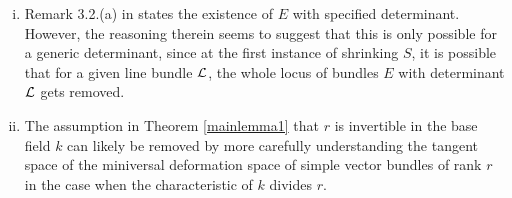 \documentclass[letterpaper,12pt]{amsart}
\theoremstyle{remark}
\begin{document}
\begin{enumerate}[(i)]
    \item Remark 3.2.(a) in \cite{seshadri} states the existence of $E$ with specified determinant. However, the reasoning therein seems to suggest that this is only possible for a generic determinant, since at the first instance of shrinking $S$, it is possible that for a given line bundle $\mathcal{L}$, the whole locus of bundles $E$ with determinant $\mathcal{L}$ gets removed.
    
    \item The assumption in Theorem \ref{mainlemma1} that $r$ is invertible in the base field $k$ can likely be removed by more carefully understanding the tangent space of the miniversal deformation space of simple vector bundles of rank $r$ in the case when the characteristic of $k$ divides $r$.
\end{enumerate}





\end{document}
